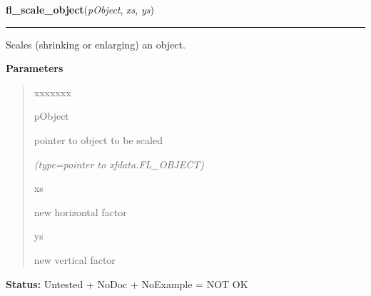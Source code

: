 \hspace{.8\funcindent}\begin{boxedminipage}{\funcwidth}

    \raggedright \textbf{fl\_scale\_object}(\textit{pObject}, \textit{xs}, \textit{ys})

    \vspace{-1.5ex}

    \rule{\textwidth}{0.5\fboxrule}
\setlength{\parskip}{2ex}
    Scales (shrinking or enlarging) an object.

\setlength{\parskip}{1ex}
      \textbf{Parameters}
      \vspace{-1ex}

      \begin{quote}
        \begin{Ventry}{xxxxxxx}

          \item[pObject]

          pointer to object to be scaled

            {\it (type=pointer to xfdata.FL\_OBJECT)}

          \item[xs]

          new horizontal factor

          \item[ys]

          new vertical factor

        \end{Ventry}

      \end{quote}

\textbf{Status:} Untested + NoDoc + NoExample = NOT OK



    \end{boxedminipage}

    \label{xformslib:library:fl_show_object}

    \vspace{0.5ex}

